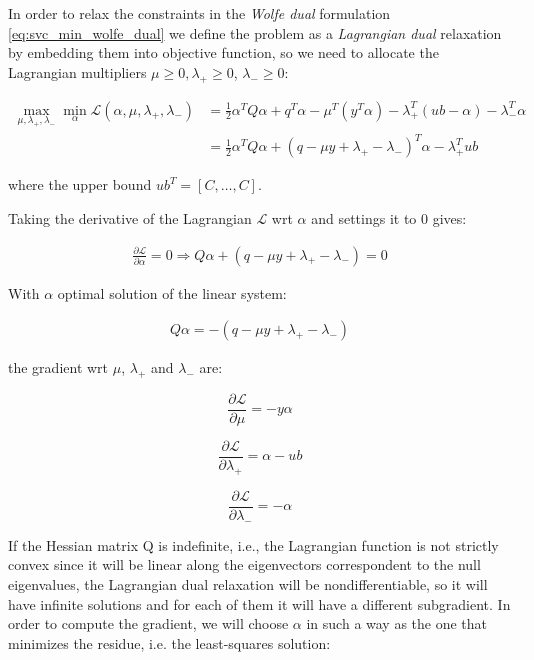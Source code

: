 In order to relax the constraints in the \emph{Wolfe dual} formulation \ref{eq:svc_min_wolfe_dual} we define the problem as a \emph{Lagrangian dual} relaxation by embedding them into objective function, so we need to allocate the Lagrangian multipliers $\mu \geq 0, \lambda_+ \geq 0$, $\lambda_- \geq 0$:

\begin{align*}
    \max_{\mu,\lambda_+,\lambda_-} \min_{\alpha} \mathcal{L}(\alpha,\mu,\lambda_+,\lambda_-) &= \frac{1}{2} \alpha^T Q\alpha+q^T\alpha - \mu^T (y^T \alpha) - \lambda_+^T (ub - \alpha) - \lambda_-^T \alpha \\
    &= \frac{1}{2} \alpha^T Q\alpha + (q - \mu y + \lambda_+ - \lambda_-)^T \alpha - \lambda_+^T ub \tag{1.24}
\end{align*}

where the upper bound $ub^T = [C, \dots, C]$.

Taking the derivative of the Lagrangian $\mathcal{L}$ wrt $\alpha$ and settings it to 0 gives:

\begin{align*}
	\frac{\partial \mathcal{L}}{\partial \alpha}=0\Rightarrow Q \alpha + (q - \mu y + \lambda_+ - \lambda_-) = 0 \tag{1.25}
\end{align*}

With $\alpha$ optimal solution of the linear system:

\begin{align*}
    Q \alpha = - (q - \mu y + \lambda_+ - \lambda_-) \tag{1.26}
\end{align*}

the gradient wrt $\mu$, $\lambda_+$ and $\lambda_-$ are:

\begin{equation}
	\frac{\partial \mathcal{L}}{\partial \mu}=-y \alpha \tag{1.27}
\end{equation}

\begin{equation}
	\frac{\partial \mathcal{L}}{\partial \lambda_+}=\alpha - ub \tag{1.28}
\end{equation}

\begin{equation}
    \frac{\partial \mathcal{L}}{\partial \lambda_-}=-\alpha \tag{1.29}
\end{equation}

If the Hessian matrix Q is indefinite, i.e., the Lagrangian function is not strictly convex since it will be linear along the eigenvectors correspondent to the null eigenvalues, the Lagrangian dual relaxation will be nondifferentiable, so it will have infinite solutions and for each of them it will have a different subgradient. In order to compute the gradient, we will choose $\alpha$ in such a way as the one that minimizes the residue, i.e. the least-squares solution:

